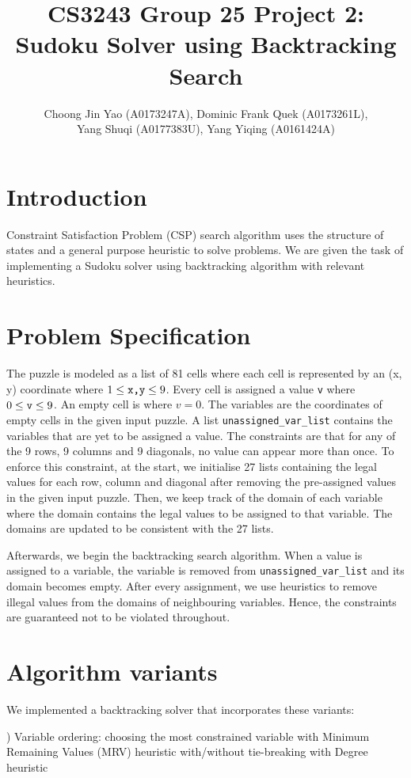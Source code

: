 \documentclass[9.5pt]{extarticle}
\title{CS3243 Group 25 Project 2: Sudoku Solver using Backtracking Search}
\author{Choong Jin Yao (A0173247A), Dominic Frank Quek (A0173261L),\\ Yang Shuqi (A0177383U), Yang Yiqing (A0161424A)}
\begin{document}
\maketitle

\section{Introduction}
Constraint Satisfaction Problem (CSP) search algorithm uses the structure of states and a general purpose heuristic to solve problems. We are given the task of implementing a Sudoku solver using backtracking algorithm with relevant heuristics. 

\section{Problem Specification}
The puzzle is modeled as a list of 81 cells where each cell is represented by an (x, y) coordinate where $ 1\leq \verb`x,y` \leq 9$. Every cell is assigned a value \verb`v` where  $ 0\leq \verb`v` \leq 9$. An empty cell is where $v = 0$. The variables are the coordinates of empty cells in the given input puzzle. A list \verb`unassigned_var_list` contains the variables that are yet to be assigned a value. The constraints are that for any of the 9 rows, 9 columns and 9 diagonals, no value can appear more than once. To enforce this constraint, at the start, we initialise 27 lists containing the legal values for each row, column and diagonal after removing the pre-assigned values in the given input puzzle. Then, we keep track of the domain of each variable where the domain contains the legal values to be assigned to that variable. The domains are updated to be consistent with the 27 lists. 

Afterwards, we begin the backtracking search algorithm. When a value is assigned to a variable, the variable is removed from \verb`unassigned_var_list` and its domain becomes empty. After every assignment, we use heuristics to remove illegal values from the domains of neighbouring variables. Hence, the constraints are guaranteed not to be violated throughout.

\section{Algorithm variants}
We implemented a backtracking solver that incorporates these variants: 

\indent {}) Variable ordering: choosing the most constrained variable with Minimum Remaining Values (MRV) \indent \indent heuristic with/without tie-breaking with Degree heuristic
\end{document}
